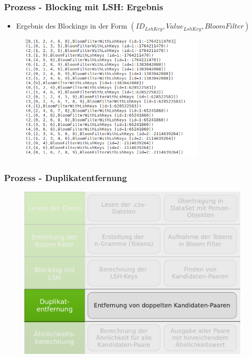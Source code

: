 \documentclass{beamer}
\begin{document}
    \begin{frame}
    		\frametitle{Prozess - Blocking mit LSH: Ergebnis}
    		\begin{itemize}
    			\item Ergebnis des Blockings in der Form $(ID_{LshKey}, Value_{LshKey},
    			 BloomFilter)$
    		\end{itemize}
    		\begin{figure}[H]
    			\includegraphics[width=0.8\textwidth]{graphics/lsh.png}
    		\end{figure}
    \end{frame}
    
    \begin{frame}
    		\frametitle{Prozess - Duplikatentfernung}
    		\begin{figure}[H]
    			\includegraphics[width=\textwidth]{graphics/process_4.png}
    		\end{figure}
    \end{frame}
    
\end{document}

